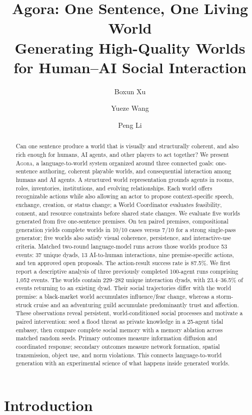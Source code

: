 \documentclass[10pt,twocolumn]{article}
\title{\textbf{Agora: One Sentence, One Living World}\\
Generating High-Quality Worlds for Human--AI Social Interaction}
\author{Boxun Xu \and Yueze Wang \and Peng Li}
\date{}
\newcommand{\agora}{\textsc{Agora}\xspace}
\begin{document}
\maketitle

\begin{abstract}
Can one sentence produce a world that is visually and structurally coherent,
and also rich enough for humans, AI agents, and other players to act together?
We present \agora, a language-to-world system organized around three connected
goals: one-sentence authoring, coherent playable worlds, and consequential
interaction among humans and AI agents. A structured world representation
grounds agents in rooms, roles, inventories, institutions, and evolving
relationships. Each world offers recognizable actions while also allowing an
actor to propose context-specific speech, exchange, creation, or status change;
a World Coordinator evaluates feasibility, consent, and resource constraints
before shared state changes. We evaluate five worlds generated from five
one-sentence premises. On ten paired premises, compositional generation yields
complete worlds in 10/10 cases versus 7/10 for a strong single-pass generator;
five worlds also satisfy visual coherence, persistence, and interactive-use
criteria. Matched two-round language-model runs across those worlds produce 53
events: 37 unique dyads, 13 AI-to-human interactions, nine premise-specific
actions, and ten approved open proposals. The action-result
success rate is 87.5\%.
We first report a descriptive analysis of three previously completed 100-agent
runs comprising 1,052 events. The worlds contain 229--282 unique
interaction dyads, with 23.4--36.5\% of events returning to an existing dyad.
Their social trajectories differ with the
world premise: a black-market world accumulates influence/fear change, whereas
a storm-struck cruise and an adventuring guild accumulate predominantly trust
and affection. These observations reveal persistent, world-conditioned social
processes and motivate a paired intervention: seed a flood threat as private
knowledge in a 25-agent tidal embassy, then compare complete social memory with
a memory ablation across matched random seeds. Primary outcomes measure
information diffusion and coordinated response; secondary outcomes measure
network formation, spatial transmission, object use, and norm violations.
This connects language-to-world generation with an experimental science of what
happens inside generated worlds.
\end{abstract}

\section{Introduction}
\end{document}
